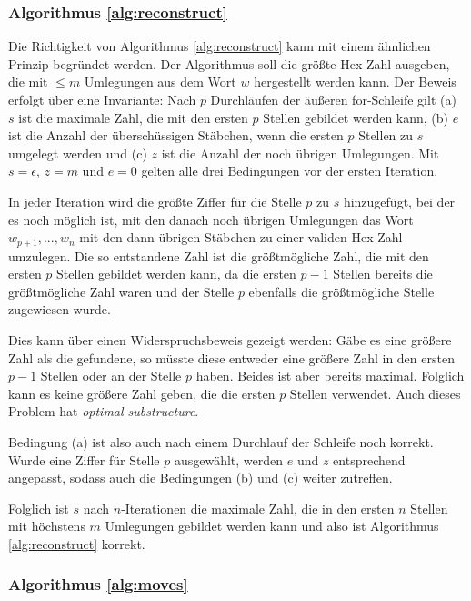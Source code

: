 \documentclass[a4paper,10pt,ngerman]{scrartcl}
\begin{document}
\subsubsection{Algorithmus \ref*{alg:reconstruct}}
Die Richtigkeit von Algorithmus \ref{alg:reconstruct} kann mit einem ähnlichen Prinzip begründet werden. 
Der Algorithmus soll die größte Hex-Zahl ausgeben, die mit $\leq m$ Umlegungen aus dem Wort $w$ hergestellt werden kann.
Der Beweis erfolgt über eine Invariante: Nach $p$ Durchläufen der äußeren for-Schleife gilt (a) $s$ ist die maximale Zahl, die mit den ersten $p$ Stellen gebildet werden kann, (b) $e$ ist die Anzahl der überschüssigen Stäbchen, wenn die ersten $p$ Stellen zu $s$ umgelegt werden und (c) $z$ ist die Anzahl der noch übrigen Umlegungen.
Mit $s = \epsilon$, $z = m$ und $e = 0$ gelten alle drei Bedingungen vor der ersten Iteration.

In jeder Iteration wird die größte Ziffer für die Stelle $p$ zu $s$ hinzugefügt, bei der es noch möglich ist, mit den danach noch übrigen Umlegungen das Wort $w_{p+1}, ..., w_n$ mit den dann übrigen Stäbchen zu einer validen Hex-Zahl umzulegen. 
Die so entstandene Zahl ist die größtmögliche Zahl, die mit den ersten $p$ Stellen gebildet werden kann, da die ersten $p-1$ Stellen bereits die größtmögliche Zahl waren und der Stelle $p$ ebenfalls die größtmögliche Stelle zugewiesen wurde. 

Dies kann über einen Widerspruchsbeweis gezeigt werden: Gäbe es eine größere Zahl als die gefundene, so müsste diese entweder eine größere Zahl in den ersten $p-1$ Stellen oder an der Stelle $p$ haben. Beides ist aber bereits maximal. Folglich kann es keine größere Zahl geben, die die ersten $p$ Stellen verwendet. Auch dieses Problem hat \textit{optimal substructure}.

Bedingung (a) ist also auch nach einem Durchlauf der Schleife noch korrekt. Wurde eine Ziffer für Stelle $p$ ausgewählt, werden $e$ und $z$ entsprechend angepasst, sodass auch die Bedingungen (b) und (c) weiter zutreffen. 

Folglich ist $s$ nach $n$-Iterationen die maximale Zahl, die in den ersten $n$ Stellen mit höchstens $m$ Umlegungen gebildet werden kann und also ist Algorithmus \ref{alg:reconstruct} korrekt.

\subsubsection{Algorithmus \ref*{alg:moves}}
\end{document}
